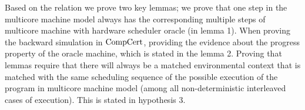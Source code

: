 


Based on the relation we prove two key lemmas; 
we prove that one step in the multicore machine model always has the corresponding multiple steps of multicore machine with hardware scheduler oracle (in lemma 1). 
When proving the backward simulation in $\mathrm{CompCert}$, providing the evidence about the progress property of the oracle machine, which is stated in the lemma 2. 
Proving that lemmas require that there will always be a matched environmental context that is matched with the same scheduling sequence of the possible execution of the program in multicore machine model (among all non-deterministic interleaved cases of execution). 
This is stated in hypothesis 3. 


